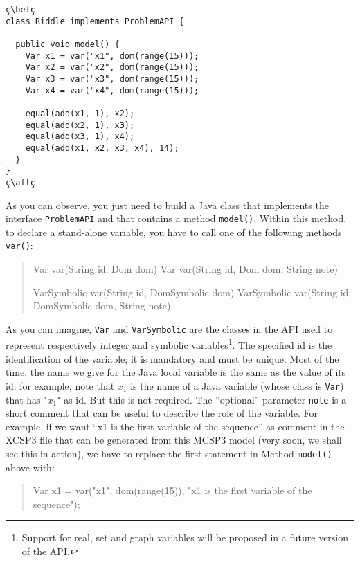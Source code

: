 \documentclass[10pt]{article}
\def\xt{{\rm XCSP3}\xspace}
\newcommand{\nn}[1]{{\tt #1}} %
\def\mt{{\rm MCSP3}\xspace}
\def\xt{{\rm XCSP3}\xspace}
\newenvironment{myvb}{\endgraf\small\verbatim}{\endverbatim}
\def\bef{\rule{10cm}{0.1mm}} %
\def\aft{\rule{10cm}{0.1mm}\medskip}
\begin{document}
\begin{lstlisting}
ç\befç
class Riddle implements ProblemAPI {

  public void model() {
    Var x1 = var("x1", dom(range(15)));
    Var x2 = var("x2", dom(range(15)));
    Var x3 = var("x3", dom(range(15)));
    Var x4 = var("x4", dom(range(15)));
    
    equal(add(x1, 1), x2);
    equal(add(x2, 1), x3);
    equal(add(x3, 1), x4);
    equal(add(x1, x2, x3, x4), 14);
  }
}
ç\aftç
\end{lstlisting}

As you can observe, you just need to build a Java class that implements the interface \nn{ProblemAPI} and that contains a method \nn{model()}.
Within this method, to declare a stand-alone variable, you have to call one of the following methods \nn{var()}: 

\begin{quote}
\begin{myvb}
Var var(String id, Dom dom) 
Var var(String id, Dom dom, String note)

VarSymbolic var(String id, DomSymbolic dom) 
VarSymbolic var(String id, DomSymbolic dom, String note)
\end{myvb}
\end{quote}

As you can imagine, \nn{Var} and \nn{VarSymbolic} are the classes in the API used to represent respectively integer and symbolic variables\footnote{Support for real, set and graph variables will be proposed in a future version of the API.}.
The specified id is the identification of the variable; it is mandatory and must be unique.
Most of the time, the name we give for the Java local variable is the same as the value of its id: for example, note that $x_1$ is the name of a Java variable (whose class is \nn{Var}) that has "$x_1$" as id.
But this is not required.
The ``optional'' parameter \nn{note} is a short comment that can be useful to describe the role of the variable.
For example, if we want ``x1 is the first variable of the sequence'' as comment in the \xt file that can be generated from this \mt model (very soon, we shall see this in action), we have to replace the first statement in Method \nn{model()} above with:

\begin{quote}
\begin{myvb}
Var x1 = var("x1", dom(range(15)), "x1 is the first variable of the sequence");
\end{myvb}
\end{quote}
\end{document}

